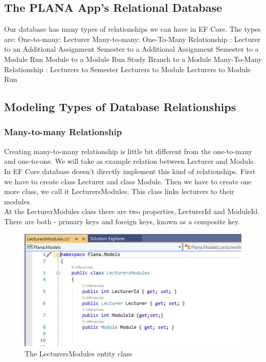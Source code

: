 \documentclass{scrartcl}
\begin{document}
\subsection{The PLANA App's Relational Database}
Our database has many types of relationships we can have in EF Core. The types are:
One-to-many: Lecturer
Many-to-many:
One-To-Many Relationship : 
Lecturer to an Additional Assignment 
Semester to a Additional Assignment
Semester to a Module Run 
Module to a Module Run
Study Branch to a Module
Many-To-Many Relationship :
Lecturers to Semester
Lecturers to Module
Lecturers to Module Run




\subsection{Modeling Types of Database Relationships}
\subsubsection{Many-to-many Relationship }
Creating many-to-many relationship is little bit different from the one-to-many and one-to-one.
We will take as example relation between Lecturer and Module.\\

In EF Core database doesn't directly implement this kind of relationships.
First we have to create class Lecturer and class Module. Then we have to create one more class, we call it LecturersModules. This class links lecturers to their modules. \\
At the LecturerModules class there are two properties, LecturerId and ModuleId. There are both - primary keys and foreign keys, known as a composite key.\cite{efa}


\begin{figure}[H]
\centering
\includegraphics[width=150mm]{report_img/lecturers-modules.JPG}
\caption{The LecturersModules entity class}
\label{blabla}
\end{figure}
\end{document}

